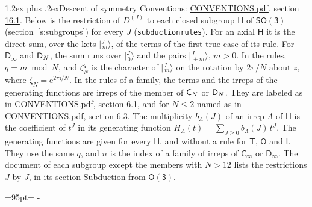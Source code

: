 \documentclass[10pt,a4paper]{article}
\makeatletter
\renewcommand\section{\@startsection{section}{1}{\z@}{-3ex plus -1ex minus -.2ex}%
  {1.2ex plus .2ex}{\normalfont\large\sffamily\bfseries\color{parttitle}}}
\newcommand{\needspace}[1]{\par\penalty-100\begingroup\dimen0=#1\relax\dimen2=\pagegoal
  \advance\dimen2-\pagetotal\ifdim\dimen0>\dimen2\relax\ifdim\dimen2>0pt\vfil\break\fi\fi
  \endgroup}
\numberwithin{equation}{section}
\newcommand{\grp}[1]{\mathsf{#1}}
\newcommand{\iunit}{\mathrm{i}}
\newcommand{\expe}{\mathrm{e}}
\newcommand{\rootunity}[1]{\zeta_{#1}}
\newcommand{\irrJ}[1]{D^{(#1)}}
\newcommand{\jm}[2]{\bigl\lvert{}^{#1}_{\,#2}\bigr\rangle}
\makeatother
\begin{document}
\section{Descent of symmetry}\label{s:subduction}
Conventions: \href{../../CONVENTIONS.pdf}{CONVENTIONS.pdf}, section \href{../../CONVENTIONS.pdf\#conv.16.1}{16.1}.
Below is the restriction of $\irrJ{J}$ to each closed subgroup $\grp{H}$ of $\grp{SO(3)}$ (section~\ref{s:subgroups}) for every $J$ (\texttt{subductionrules}). \label{n:irrep.Gamma.subgroup}For an axial $\grp{H}$ it is the direct sum, over the kets $\jm{J}{m}$, of the terms of the first true case of its rule. For \href{Dinf.pdf}{$\grp{D_{\infty}}$} and $\grp{D_{\mathnormal{N}}}$, the sum runs over $\jm{J}{0}$ and the pairs $\jm{J}{\pm m}$, \mbox{$m > 0$}. \label{n:index.residue}\label{n:constant.root}In the rules, $q = m \bmod N$, and $\rootunity{N}^{q}$ is the character of $\jm{J}{m}$ on the rotation by $2\pi/N$ about $z$, where $\rootunity{N} = \expe^{2\pi\iunit/N}$. In the rules of a family, the terms and the irreps of the generating functions are irreps of the member of $\grp{C_{\mathnormal{N}}}$ or $\grp{D_{\mathnormal{N}}}$. They are labeled as in \href{../../CONVENTIONS.pdf}{CONVENTIONS.pdf}, section \href{../../CONVENTIONS.pdf\#conv.6.1}{6.1}, and for $N \le 2$ named as in \href{../../CONVENTIONS.pdf}{CONVENTIONS.pdf}, section \href{../../CONVENTIONS.pdf\#conv.6.3}{6.3}. \label{n:function.multiplicity}\label{n:irrep.Delta}\label{n:index.generating.variable}\label{n:function.generating}\label{n:function.generating.numerator}The multiplicity $b_\Lambda(J)$ of an irrep $\Lambda$ of $\grp{H}$ is the coefficient of $t^J$ in its generating function $H_\Lambda(t) = \sum_{J\ge0} b_\Lambda(J)\, t^J$. The generating functions are given for every $\grp{H}$, and without a rule for \href{T.pdf}{$\grp{T}$}, \href{O.pdf}{$\grp{O}$} and \href{I.pdf}{$\grp{I}$}. They use the same $q$, and $n$ is the index of a family of irreps of \href{Cinf.pdf}{$\grp{C_{\infty}}$} or \href{Dinf.pdf}{$\grp{D_{\infty}}$}. The document of each subgroup except the members with $N > 12$ lists the restrictions $J$ by $J$, in its section Subduction from \href{O3.pdf}{$\grp{O(3)}$}.
\needspace{95pt}
\end{document}
